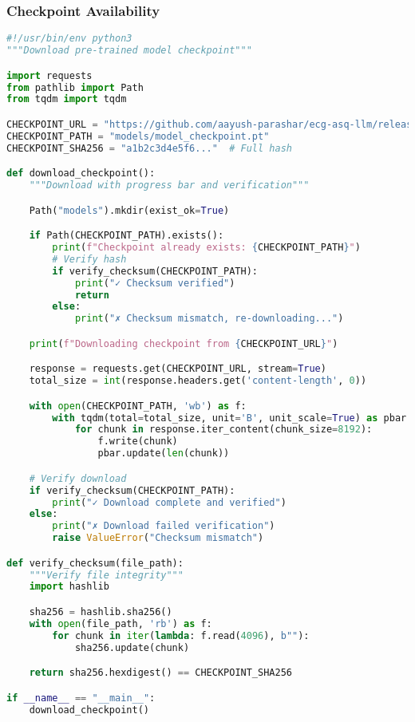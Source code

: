\documentclass[11pt]{article}
\begin{document}
\subsubsection{Checkpoint Availability}

\begin{lstlisting}[language=python, caption=Download Pre-Trained Checkpoint]
#!/usr/bin/env python3
"""Download pre-trained model checkpoint"""

import requests
from pathlib import Path
from tqdm import tqdm

CHECKPOINT_URL = "https://github.com/aayush-parashar/ecg-asq-llm/releases/download/v1.0.0/model_checkpoint.pt"
CHECKPOINT_PATH = "models/model_checkpoint.pt"
CHECKPOINT_SHA256 = "a1b2c3d4e5f6..."  # Full hash

def download_checkpoint():
    """Download with progress bar and verification"""

    Path("models").mkdir(exist_ok=True)

    if Path(CHECKPOINT_PATH).exists():
        print(f"Checkpoint already exists: {CHECKPOINT_PATH}")
        # Verify hash
        if verify_checksum(CHECKPOINT_PATH):
            print("✓ Checksum verified")
            return
        else:
            print("✗ Checksum mismatch, re-downloading...")

    print(f"Downloading checkpoint from {CHECKPOINT_URL}")

    response = requests.get(CHECKPOINT_URL, stream=True)
    total_size = int(response.headers.get('content-length', 0))

    with open(CHECKPOINT_PATH, 'wb') as f:
        with tqdm(total=total_size, unit='B', unit_scale=True) as pbar:
            for chunk in response.iter_content(chunk_size=8192):
                f.write(chunk)
                pbar.update(len(chunk))

    # Verify download
    if verify_checksum(CHECKPOINT_PATH):
        print("✓ Download complete and verified")
    else:
        print("✗ Download failed verification")
        raise ValueError("Checksum mismatch")

def verify_checksum(file_path):
    """Verify file integrity"""
    import hashlib

    sha256 = hashlib.sha256()
    with open(file_path, 'rb') as f:
        for chunk in iter(lambda: f.read(4096), b""):
            sha256.update(chunk)

    return sha256.hexdigest() == CHECKPOINT_SHA256

if __name__ == "__main__":
    download_checkpoint()
\end{lstlisting}
\end{document}
